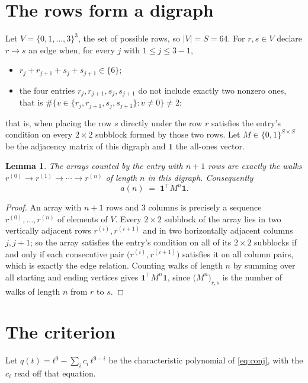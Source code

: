 \documentclass[11pt,a4paper]{article}
\theoremstyle{plain}
\newtheorem{lemma}[theorem]{Lemma}
\theoremstyle{definition}
\begin{document}
\section{The rows form a digraph}

Let $V=\{0,1,\dots,3\}^{3}$, the set of possible rows, so $|V|=S=64$. For
$r,s\in V$ declare $r\to s$ an edge when, for every $j$ with $1\le j\le 3-1$,
\begin{itemize}
\item $r_j+r_{j+1}+s_j+s_{j+1}\in\{6\}$;
\item the four entries $r_j,r_{j+1},s_j,s_{j+1}$ do not include exactly two nonzero ones, that is $\#\bigl\{v\in\{r_j,r_{j+1},s_j,s_{j+1}\}: v\ne0\bigr\}\ne2$;
\end{itemize}
that is, when placing the row $s$ directly under the row $r$ satisfies the entry's
condition on every $2\times2$ subblock formed by those two rows. Let $M\in\{0,1\}^{S\times
S}$ be the adjacency matrix of this digraph and $\mathbf{1}$ the all-ones vector.

\begin{lemma}\label{lem:walk}
The arrays counted by the entry with $n+1$ rows are exactly the walks
$r^{(0)}\to r^{(1)}\to\cdots\to r^{(n)}$ of length $n$ in this digraph. Consequently
\[
a(n)\;=\;\mathbf{1}^{\!\top}M^{n}\mathbf{1} .
\]
\end{lemma}

\begin{proof}
An array with $n+1$ rows and $3$ columns is precisely a sequence
$r^{(0)},\dots,r^{(n)}$ of elements of $V$. Every $2\times2$ subblock of the array lies
in two vertically adjacent rows $r^{(i)},r^{(i+1)}$ and in two horizontally adjacent
columns $j,j+1$; so the array satisfies the entry's condition on all of its $2\times2$
subblocks if and only if each consecutive pair $\bigl(r^{(i)},r^{(i+1)}\bigr)$ satisfies
it on all column pairs, which is exactly the edge relation. Counting walks of length $n$ by
summing over all starting and ending vertices gives
$\mathbf{1}^{\!\top}M^{n}\mathbf{1}$, since
$\bigl(M^{n}\bigr)_{r,s}$ is the number of walks of length $n$ from $r$ to $s$.
\end{proof}

\section{The criterion}

Let $q(t)=t^{9}-\sum_{i}c_i\,t^{9-i}$ be the characteristic polynomial of
\eqref{eq:conj}, with the $c_i$ read off that equation.
\end{document}

